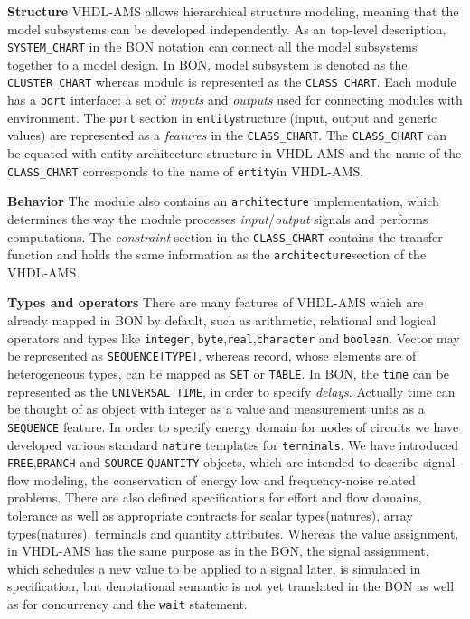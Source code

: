 \documentclass{article}
\def\lstinlinen{\lstinline[language=Bon,basicstyle=\normalsize\upshape]}
\newcommand{\ent}{entity\xspace}
\newcommand{\arch}{architecture\xspace}
\begin{document}
\textbf{Structure} \xspace \xspace VHDL-AMS allows hierarchical
structure modeling, meaning that the model subsystems can be developed
independently.  As an top-level description, \lstinlinen|SYSTEM_CHART|
in the BON notation can connect all the model subsystems together to a
model design.  In BON, model subsystem is denoted as the
\lstinlinen|CLUSTER_CHART| whereas module is represented as the
\lstinlinen|CLASS_CHART|.  Each module has a \texttt{port} interface:
a set of \emph{inputs} and \emph{outputs} used for connecting modules
with environment. The \texttt{port} section in \texttt{\ent}structure
(input, output and generic values) are represented as a
\emph{features} in the \lstinlinen|CLASS_CHART|.  The
\lstinlinen|CLASS_CHART| \xspace can be equated with \ent-\arch
structure in VHDL-AMS and the name of the
\lstinlinen|CLASS_CHART|\xspace corresponds to the name of
\texttt{\ent}in VHDL-AMS.
 
\textbf{Behavior} \xspace \xspace The module also contains an
\texttt{\arch} implementation, which determines the way the module
processes \emph{input}/\emph{output} signals and performs
computations.  The \emph{constraint} section in the
\lstinlinen|CLASS_CHART| contains the transfer function and holds the
same information as the \texttt{\arch}section of the VHDL-AMS.
 
\textbf{Types and operators} \xspace \xspace There are many features
of VHDL-AMS which are already mapped in BON by default, such as
arithmetic, relational and logical operators and types like \xspace
\texttt{integer}, \xspace
\texttt{byte},\xspace\texttt{real},\xspace\texttt{character} and
\xspace\texttt{boolean}.  Vector may be represented as
\lstinlinen|SEQUENCE[TYPE]|, whereas record, whose elements are of
heterogeneous types, can be mapped as \lstinlinen|SET| or
\lstinlinen|TABLE|.  In BON, the \texttt{time} can be represented as
the \lstinlinen|UNIVERSAL_TIME|, in order to specify
\emph{delays}. Actually time can be thought of as object with integer
as a value and measurement units as a \xspace \lstinlinen|SEQUENCE|
feature.  In order to specify energy domain for nodes of circuits we
have developed various standard \texttt{nature} templates for
\texttt{terminals}.  We have introduced
\xspace\lstinlinen|FREE|,\xspace \lstinlinen|BRANCH| and
\xspace\lstinlinen|SOURCE| \space \lstinlinen|QUANTITY| objects, which
are intended to describe signal-flow modeling, the conservation of
energy low and frequency-noise related problems.  There are also
defined specifications for effort and flow domains, tolerance as well
as appropriate contracts for scalar types(natures), array
types(natures), terminals and quantity attributes.  Whereas the value
assignment, in VHDL-AMS has the same purpose as in the BON, the signal
assignment, which schedules a new value to be applied to a signal
later, is simulated in specification, but denotational semantic is not
yet translated in the BON as well as for concurrency and the
\texttt{wait} statement.
  
\end{document}
